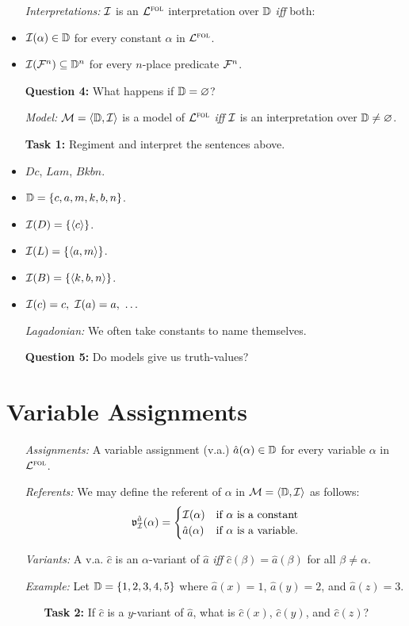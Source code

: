 \documentclass[a4paper, 11pt]{article} %
\begin{document}
\begin{itemize}
  \item[\it Interpretations:] $\mathcal{I}$ is an $\mathcal{L}^{\textsc{fol}}$ interpretation over $\mathbb{D}$ \textit{iff} both: 
    \item $\mathcal{I}(\alpha)\in\mathbb{D}$ for every constant $\alpha$ in $\mathcal{L}^{\textsc{fol}}$. 
    \item $\mathcal{I}(\mathcal{F}^n)\subseteq\mathbb{D}^n$ for every $n$-place predicate $\mathcal{F}^n$.
  \item[\bf Question 4:] What happens if $\mathbb{D}=\varnothing$?
  \item[\it Model:] $\mathcal{M}=\langle\mathbb{D},\mathcal{I}\rangle$ is a model of $\mathcal{L}^{\textsc{fol}}$ \textit{iff} $\mathcal{I}$ is an interpretation over $\mathbb{D}\neq\varnothing$.
  \item[\bf Task 1:] Regiment and interpret the sentences above.
    \item $Dc$, $Lam$, $Bkbn$.
    \item $\mathbb{D}=\lbrace c,a,m,k,b,n\rbrace$.
    \item $\mathcal{I}(D)=\lbrace\langle c\rangle\rbrace$.
    \item $\mathcal{I}(L)=\lbrace\langle a,m\rangle\rbrace$.
    \item $\mathcal{I}(B)=\lbrace\langle k,b,n\rangle\rbrace$.
    \item $\I(c)=c,\ \I(a)=a,\ \ldots$
  \item[\it Lagadonian:] We often take constants to name themselves.
  \item[\bf Question 5:] Do models give us truth-values?
\end{itemize}



\section*{Variable Assignments}

\begin{enumerate}
  \item[\it Assignments:] A variable assignment (v.a.) $\hat{a}(\alpha)\in\mathbb{D}$ for every variable $\alpha$ in $\mathcal{L}^{\textsc{fol}}$.
  \item[\it Referents:] We may define the referent of $\alpha$ in $\mathcal{M}=\langle\mathbb{D},\mathcal{I}\rangle$ as follows:
    \begin{align*}
      \mathfrak{v}_{\mathcal{I}}^{\hat{a}}{(\alpha)}=
        \begin{cases}
          \mathcal{I}(\alpha) & \text{if } \alpha \text{ is a constant} \\
          \hat{a}(\alpha) & \text{if } \alpha \text{ is a variable.}
        \end{cases}
    \end{align*}
  \item[\it Variants:] A v.a. $\hat{c}$ is an $\alpha$-variant of $\hat{a}$ \textit{iff} $\hat{c}(\beta)=\hat{a}(\beta)$ for all $\beta\neq\alpha$.
  \item[\it Example:] Let $\mathbb{D}=\lbrace1,2,3,4,5\rbrace$ where $\hat{a}(x)=1$, $\hat{a}(y)=2$, and $\hat{a}(z)=3$.
    \begin{itemize}
      \item[\bf Task 2:] If $\hat{c}$ is a $y$-variant of $\hat{a}$, what is $\hat{c}(x)$, $\hat{c}(y)$, and $\hat{c}(z)$?
    \end{itemize}
\end{enumerate}
\end{document}

